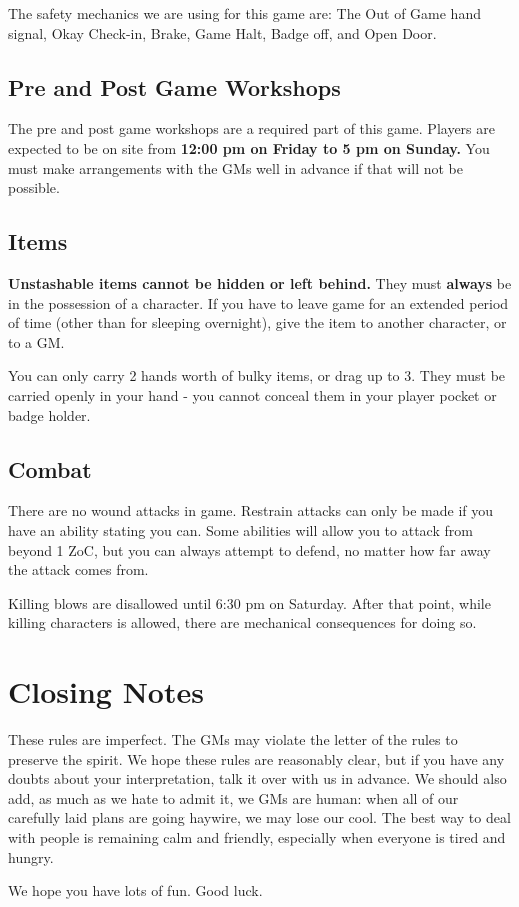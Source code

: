 \documentclass[sheet]{GL2020}
\begin{document}
The safety mechanics we are using for this game are: The Out of Game hand signal, Okay Check-in, Brake, Game Halt, Badge off, and Open Door.

\subsection{Pre and Post Game Workshops}
The pre and post game workshops are a required part of this game. Players are expected to be on site from \textbf{12:00 pm on Friday to 5 pm on Sunday.} You must make arrangements with the GMs well in advance if that will not be possible.

\subsection{Items}
\textbf{Unstashable items cannot be hidden or left behind.} They must \textbf{always} be in the possession of a character. If you have to leave game for an extended period of time (other than for sleeping overnight), give the item to another character, or to a GM. 

You can only carry 2 hands worth of bulky items, or drag up to 3. They must be carried openly in your hand - you cannot conceal them in your player pocket or badge holder.

\subsection{Combat}
There are no wound attacks in game. Restrain attacks can only be made if you have an ability stating you can. Some abilities will allow you to attack from beyond 1 ZoC, but you can always attempt to defend, no matter how far away the attack comes from.

Killing blows are disallowed until 6:30 pm on Saturday. After that point, while killing characters is allowed, there are mechanical consequences for doing so.

\section{Closing Notes}

These rules are imperfect.  The GMs may violate the letter of the rules to preserve the spirit.  We hope these rules are reasonably clear, but if you have any doubts about your interpretation, talk it over with us in advance.  We should also add, as much as we hate to admit it, we GMs are human: when all of our carefully laid plans are going haywire, we may lose our cool.  The best way to deal with people is remaining calm and friendly, especially when everyone is tired and hungry.

We hope you have lots of fun.  Good luck.
\end{document}
